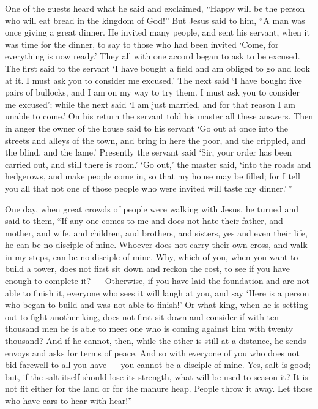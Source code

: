  One of the guests heard what he said and exclaimed,
``Happy will be the person who will eat bread in the kingdom of God!''
 But Jesus said to him, ``A man was once giving a great
dinner. He invited many people,  and sent his servant, when
it was time for the dinner, to say to those who had been invited `Come,
for everything is now ready.'  They all with one accord
began to ask to be excused. The first said to the servant `I have bought
a field and am obliged to go and look at it. I must ask you to consider
me excused.'  The next said `I have bought five pairs of
bullocks, and I am on my way to try them. I must ask you to consider me
excused';  while the next said `I am just married, and for
that reason I am unable to come.'  On his return the
servant told his master all these answers. Then in anger the owner of
the house said to his servant `Go out at once into the streets and
alleys of the town, and bring in here the poor, and the crippled, and
the blind, and the lame.'  Presently the servant said `Sir,
your order has been carried out, and still there is room.' 
`Go out,' the master said, `into the roads and hedgerows, and make
people come in, so that my house may be filled;  for I tell
you all that not one of those people who were invited will taste my
dinner.'\,''

 One day, when great crowds of people were walking with
Jesus, he turned and said to them,  ``If any one comes to
me and does not hate their father, and mother, and wife, and children,
and brothers, and sisters, yes and even their life, he can be no
disciple of mine.  Whoever does not carry their own cross,
and walk in my steps, can be no disciple of mine.  Why,
which of you, when you want to build a tower, does not first sit down
and reckon the cost, to see if you have enough to complete it? ---
 Otherwise, if you have laid the foundation and are not
able to finish it, everyone who sees it will laugh at you, 
and say `Here is a person who began to build and was not able to
finish!'  Or what king, when he is setting out to fight
another king, does not first sit down and consider if with ten thousand
men he is able to meet one who is coming against him with twenty
thousand?  And if he cannot, then, while the other is still
at a distance, he sends envoys and asks for terms of peace.
 And so with everyone of you who does not bid farewell to
all you have --- you cannot be a disciple of mine.  Yes,
salt is good; but, if the salt itself should lose its strength, what
will be used to season it?  It is not fit either for the
land or for the manure heap. People throw it away. Let those who have
ears to hear with hear!''

